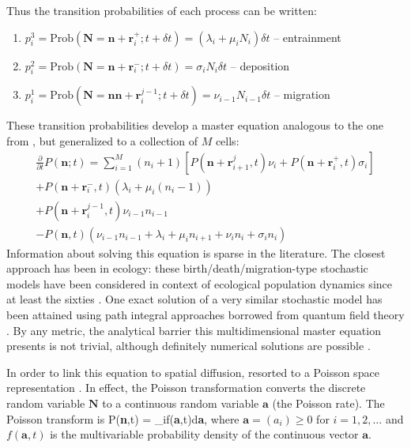 Thus the transition probabilities of each process can be written: 
\begin{enumerate}
\item $ p_i^3 = \text{Prob}(\textbf{N} = \textbf{n} + \textbf{r}_i^+; t+ \delta t) = (\lambda_i + \mu_i N_i) \delta t $ -- entrainment
\item $ p_i^2 = \text{Prob}(\textbf{N} = \textbf{n} + \textbf{r}_i^-; t+\delta t) = \sigma_i N_i \delta t $ -- deposition
\item $ p_i^1 = \text{Prob}(\textbf{N} = \textbf{n} \textbf{n} + \textbf{r}_i^{j-1}; t+ \delta t) = \nu_{i-1}N_{i-1} \delta t $ -- migration
\end{enumerate} 

These transition probabilities develop a master equation analogous to the one from \citet{Ancey2008}, but generalized to a collection of $M$ cells: 
\begin{multline} \frac{\partial}{\partial t} P(\textbf{n};t) = \sum_{i=1}^M (n_i+1)[P(\textbf{n}+\textbf{r}_{i+1}^j,t) \nu_i + P(\textbf{n}+\textbf{r}_i^+,t)\sigma_i ]\\
+ P(\textbf{n}+\textbf{r}_i^-,t)(\lambda_i + \mu_i(n_i-1))\\
+ P(\textbf{n}+\textbf{r}_i^{j-1},t)\nu_{i-1}n_{i-1}\\
- P(\textbf{n},t)(\nu_{i-1} n_{i-1}+\lambda_i + \mu_i n_{i+1} + \nu_i n_i + \sigma_i n_i ) \end{multline} 
Information about solving this equation is sparse in the literature. 
The closest approach has been in ecology: these birth/death/migration-type stochastic models have been considered in context of ecological population dynamics since at least the sixties \citep{Bailey1968}. 
One exact solution of a very similar stochastic model has been attained using path integral approaches borrowed from quantum field theory \citep{Field2010}.
By any metric, the analytical barrier this multidimensional master equation presents is not trivial, although definitely numerical solutions are possible \citep[e.g.][]{Gillespie1992}. 

In order to link this equation to spatial diffusion, \citet{Ancey2014, Ancey2015} resorted to a Poisson space representation \citep{Gardiner1983}. 
In effect, the Poisson transformation converts the discrete random variable $\textbf{N}$ to a continuous random variable $\textbf{a}$ (the Poisson rate). 
The Poisson transform is 
\be P(\textbf{n},t) = \prod_i\int {}f(\textbf{a},t)d\textbf{a}, \ee
where $\textbf{a} = (a_i) \geq 0$ for $i=1,2,\dots$ and $f(\textbf{a},t)$ is the multivariable probability density of the continuous vector $\textbf{a}$. 

